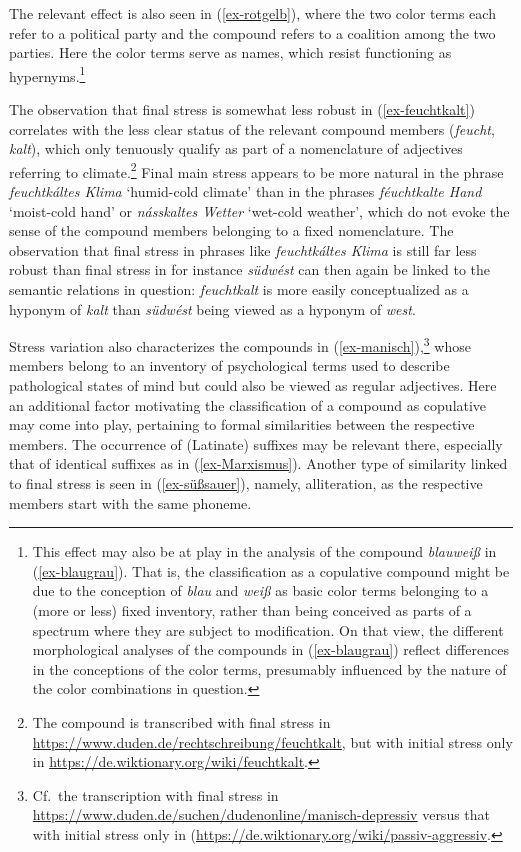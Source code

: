\documentclass[output=paper
 ,nobabel
 ,draftmode
 ,colorlinks, citecolor=brown
]{langscibook}
\begin{document}
\largerpage
The relevant effect is also seen in (\ref{ex-rotgelb}), where the two color terms each refer to a  political party and the compound refers to a coalition among the two parties. Here the color terms serve as names, which resist functioning as hypernyms.\footnote{This effect may also be at play in the analysis of the compound \emph{blauweiß} in (\ref{ex-blaugrau}). That is, the classification as a copulative compound might be due to the conception of \emph{blau} and \emph{weiß} as basic color terms belonging to a (more or less) fixed inventory, rather than being conceived as parts of a spectrum where they are subject to modification. On that view, the different morphological analyses of the compounds in (\ref{ex-blaugrau}) reflect differences in the conceptions of the color terms, presumably influenced by the nature of the color combinations in question.} 

The observation that final stress is somewhat less robust in (\ref{ex-feuchtkalt}) correlates with the less clear status of the relevant compound members (\eg \emph{feucht}, \emph{kalt}), which only tenuously qualify as part of a nomenclature of adjectives referring to climate.\footnote {The compound is transcribed with final stress in \url{https://www.duden.de/rechtschreibung/feuchtkalt}, but with initial stress only in \url{https://de.wiktionary.org/wiki/feuchtkalt}.} Final main stress appears to be more natural in the phrase \emph{feuchtkáltes Klima} `humid-cold climate' than in the phrases \emph{féuchtkalte Hand} `moist-cold hand' or \emph{násskaltes Wetter} `wet-cold weather', which do not evoke the sense of the compound members belonging to a fixed nomenclature. The observation that final stress in phrases like \emph{feuchtkáltes Klima} is still far less robust than final stress in for instance \emph{südwést} can then again be linked to the semantic relations in question: \emph{feuchtkalt} is more easily conceptualized as a hyponym of \emph{kalt} than \emph{südwést} being viewed as a hyponym of \emph{west}. 

Stress variation also characterizes the compounds in (\ref{ex-manisch}),\footnote{Cf.\ the transcription with final stress in \url{https://www.duden.de/suchen/dudenonline/manisch-depressiv} versus that with initial stress only in (\url{https://de.wiktionary.org/wiki/passiv-aggressiv}.} whose members belong to an inventory of psychological terms used to describe pathological states of mind but could also be viewed as regular adjectives. Here an additional factor motivating the classification of a compound as copulative may come into play, pertaining to formal similarities between the respective members. The occurrence of (Latinate) suffixes may be relevant there, especially that of identical suffixes as in (\ref{ex-Marxismus}). Another type of similarity linked to final stress is seen in (\ref{ex-süßsauer}), namely, alliteration, as the respective members start with the same phoneme. 
\end{document}

